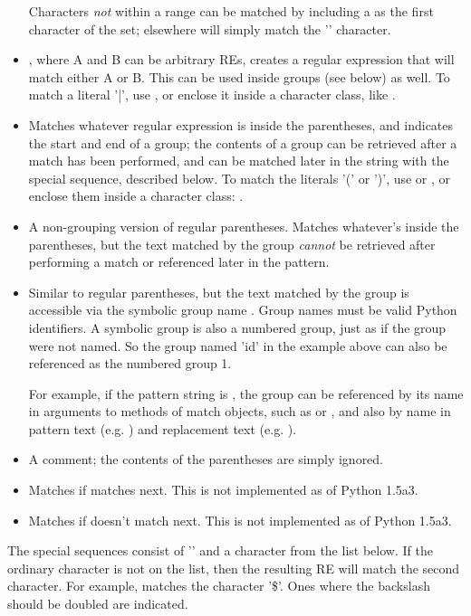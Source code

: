 \begin{itemize}
Characters \emph{not} within a range can be matched by including a
\code{\^} as the first character of the set; \code{\^} elsewhere will
simply match the '\code{\^}' character.  
%
\item[\code{|}], where A and B can be arbitrary REs,
creates a regular expression that will match either A or B.  This can
be used inside groups (see below) as well.  To match a literal '|', 
use \code{\e|}, or enclose it inside a character class, like \code{[|]}.
%
\item[\code{( ... )}] Matches whatever regular expression is inside the parentheses, and indicates the start and end of a group; the
contents of a group can be retrieved after a match has been performed,
and can be matched later in the string with the
 special sequence, described below.  To match the
literals '(' or ')', 
use \code{\e(} or \code{\e)}, or enclose them inside a character
class: \code{[(] [)]}.
%
\item[\code{(?:...)}] A non-grouping version of regular parentheses.
Matches whatever's inside the parentheses, but the text matched by the
group \emph{cannot} be retrieved after performing a match or
referenced later in the pattern. 
%
\item[\code{(?P<\var{name}>...)}] Similar to regular parentheses, but
the text matched by the group is accessible via the symbolic group
name .  Group names must be valid Python identifiers.  A
symbolic group is also a numbered group, just as if the group were not
named.  So the group named 'id' in the example above can also be
referenced as the numbered group 1.

For example, if the pattern string is
, the group can be referenced by its
name in arguments to methods of match objects, such as 
or , and also by name in pattern text (e.g. ) and
replacement text (e.g. ).
%
\item[\code{(?\#...)}] A comment; the contents of the parentheses are simply ignored.
%
\item[\code{(?=...)}] Matches if  matches next.  This is not
implemented as of  Python 1.5a3.
%
\item[\code{(?!...)}] Matches if  doesn't match next.  This is not
implemented as of Python 1.5a3.
\end{itemize}

The special sequences consist of '\code{\e}' and a character from the
list below.  If the ordinary character is not on the list, then the
resulting RE will match the second character.  For example,
\code{\e\$} matches the character '\$'.  Ones where the backslash
should be doubled are indicated.

